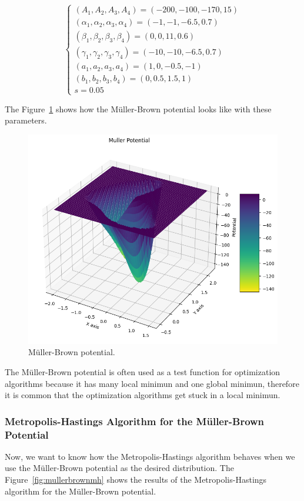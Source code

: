 \documentclass{report}
\begin{document}
\[
	\begin{cases}
		(A_1, A_2, A_3, A_4) = (-200, -100, -170, 15) \\
		(\alpha_1, \alpha_2, \alpha_3, \alpha_4) = (-1, -1, -6.5, 0.7) \\
		(\beta_1, \beta_2, \beta_3, \beta_4) = (0, 0, 11, 0.6) \\
		(\gamma_1, \gamma_2, \gamma_3, \gamma_4) = (-10, -10, -6.5, 0.7) \\
		(a_1, a_2, a_3, a_4) = (1, 0, -0.5, -1) \\
		(b_1, b_2, b_3, b_4) = (0, 0.5, 1.5, 1) \\
		s = 0.05
	\end{cases}
\]

The Figure~\ref{fig:mullerbrown} shows how the Müller-Brown potential looks like with these parameters.

\begin{figure}[H]
	\centering
	\includegraphics[width=0.5\linewidth]{./Figures/MCMC/mullerbrown.png}
	\caption{Müller-Brown potential.}
	\label{fig:mullerbrown}
\end{figure}

The Müller-Brown potential is often used as a test function for optimization algorithms because it has many local minimun and one global minimun, therefore it is common that the optimization algorithms get stuck in a local minimun.

\subsubsection{Metropolis-Hastings Algorithm for the Müller-Brown Potential}
\label{sec:metropolis_muller_brown}

Now, we want to know how the Metropolis-Hastings algorithm behaves when we use the Müller-Brown potential as the desired distribution. The Figure~\ref{fig:mullerbrownmh} shows the results of the Metropolis-Hastings algorithm for the Müller-Brown potential.
\end{document}

